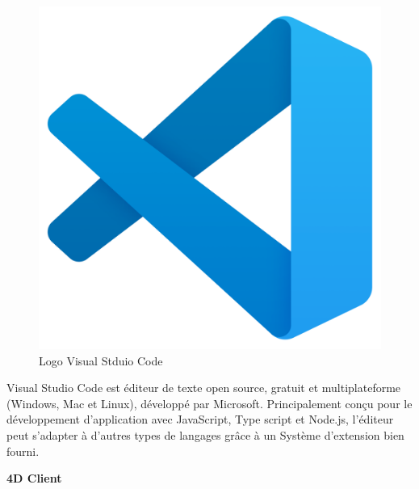 \begin{figure}[htbp]
   \centering
   \includegraphics[scale=0.06]{Images/vs.png} 
   \caption{Logo Visual Stduio Code}
   \label{fig:vscode}
\end{figure}

Visual Studio Code est éditeur de texte open source, gratuit et multiplateforme (Windows, Mac et Linux), développé
par Microsoft. Principalement conçu pour le développement
d’application avec JavaScript, Type script et Node.js, l’éditeur peut s’adapter à d’autres types de langages grâce à un
Système d’extension bien fourni.
\newline

\large 
\textbf{4D Client}

